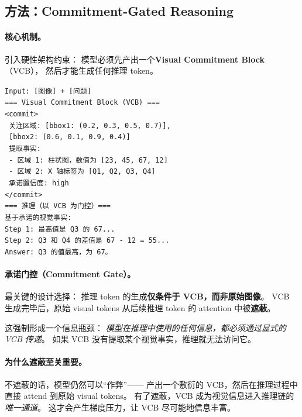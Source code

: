 \documentclass[12pt,a4paper]{article}
\begin{document}
\subsection{方法：Commitment-Gated Reasoning}

\paragraph{核心机制。}
引入硬性架构约束：
模型必须先产出一个\textbf{Visual Commitment Block}（VCB），
然后才能生成任何推理 token。

\begin{tcolorbox}[colback=gray!5,colframe=gray!50,boxrule=0.3pt,left=4pt,right=4pt]
\small
\texttt{Input: [图像] + [问题]}\\[3pt]
\texttt{=== Visual Commitment Block (VCB) ===}\\
\texttt{<commit>}\\
\texttt{  关注区域: [bbox1: (0.2, 0.3, 0.5, 0.7)],}\\
\texttt{            [bbox2: (0.6, 0.1, 0.9, 0.4)]}\\
\texttt{  提取事实:}\\
\texttt{    - 区域 1: 柱状图，数值为 [23, 45, 67, 12]}\\
\texttt{    - 区域 2: X 轴标签为 [Q1, Q2, Q3, Q4]}\\
\texttt{  承诺置信度: high}\\
\texttt{</commit>}\\[3pt]
\texttt{=== 推理（以 VCB 为门控）===}\\
\texttt{基于承诺的视觉事实:}\\
\texttt{Step 1: 最高值是 Q3 的 67...}\\
\texttt{Step 2: Q3 和 Q4 的差值是 67 - 12 = 55...}\\
\texttt{Answer: Q3 的值最高，为 67。}
\end{tcolorbox}

\paragraph{承诺门控（Commitment Gate）。}
最关键的设计选择：
推理 token 的生成\textbf{仅条件于 VCB，而非原始图像}。
VCB 生成完毕后，原始 visual tokens 从后续推理 token 的 attention 中被\textbf{遮蔽}。

这强制形成一个信息瓶颈：
\textit{模型在推理中使用的任何信息，都必须通过显式的 VCB 传递}。
如果 VCB 没有提取某个视觉事实，推理就无法访问它。

\paragraph{为什么遮蔽至关重要。}
不遮蔽的话，模型仍然可以``作弊''——
产出一个敷衍的 VCB，然后在推理过程中直接 attend 到原始 visual tokens。
有了遮蔽，VCB 成为视觉信息进入推理链的\textit{唯一通道}。
这才会产生梯度压力，让 VCB 尽可能地信息丰富。
\end{document}
